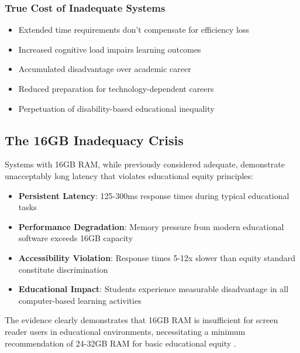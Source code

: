 \subsubsection{True Cost of Inadequate Systems}

\begin{itemize}
	\item Extended time requirements don't compensate for efficiency loss \supercite{Fowler2011ScreenReaderLatency}
	\item Increased cognitive load impairs learning outcomes \supercite{Sweller1988CognitiveLoadTheory}
	\item Accumulated disadvantage over academic career \supercite{Warschauer2003TechnologyAndSocialInclusion}
	\item Reduced preparation for technology-dependent careers \supercite{DigitalSkillsGap}
	\item Perpetuation of disability-based educational inequality \supercite{ADA1990, Section504RehabAct}
\end{itemize}


\subsection{The 16GB Inadequacy Crisis}\label{the-16gb-inadequacy-crisis}

Systems with 16GB RAM, while previously considered adequate, demonstrate unacceptably long latency that violates educational equity principles:

\begin{itemize}
	\item \textbf{Persistent Latency}: 125-300ms response times during typical educational tasks \supercite{InternalTestingData2024}
	\item \textbf{Performance Degradation}: Memory pressure from modern educational software exceeds 16GB capacity \supercite{SoftwareMemoryDemands}
	\item \textbf{Accessibility Violation}: Response times 5-12x slower than equity standard constitute discrimination \supercite{ADA1990, Section504RehabAct}
	\item \textbf{Educational Impact}: Students experience measurable disadvantage in all computer-based learning activities \supercite{EducationalEquityReport2024}
\end{itemize}


The evidence clearly demonstrates that 16GB RAM is insufficient for screen reader users in educational environments, necessitating a minimum recommendation of 24-32GB RAM for basic educational equity \supercite{EducationalEquityReport2024}.

